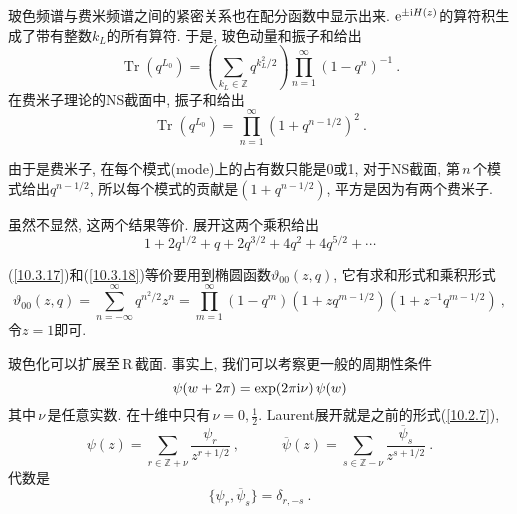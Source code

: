 玻色频谱与费米频谱之间的紧密关系也在配分函数中显示出来. $\mathrm{e}^{\pm\mathrm{i} H(z)}$的算符积生成了带有整数$k_{L}$的所有算符. 于是, 玻色动量和振子和给出
\begin{equation}
    \operatorname{Tr}(q^{L_{0}})=\left(\sum_{k_{L}\in\mathds{Z}}q^{k_{L}^{2}/2}\right)
    \prod_{n=1}^{\infty} (1-q^{n})^{-1}\:. \label{10.3.17}
\end{equation}
在费米子理论的NS截面中, 振子和给出
\begin{equation}
    \operatorname{Tr}(q^{L_{0}})=\prod_{n=1}^{\infty}(1+q^{n-1/2})^{2}\:. \label{10.3.18}
\end{equation}
\begin{tcolorbox}
由于是费米子, 在每个模式(mode)上的占有数只能是0或1, 对于NS截面, 第$\,n\,$个模式给出$q^{n-1/2}$, 所以每个模式的贡献是$(1+q^{n-1/2})$, 平方是因为有两个费米子.
\end{tcolorbox}
虽然不显然, 这两个结果等价. 展开这两个乘积给出
\begin{equation}
    1+2q^{1/2}+q+2q^{3/2}+4q^{2}+4q^{5/2} +\cdots \label{10.3.19}
\end{equation}
\begin{tcolorbox}
(\ref{10.3.17})和(\ref{10.3.18})等价要用到椭圆函数$\vartheta_{00}(z,q)$, 它有求和形式和乘积形式
\begin{equation*}
    \vartheta_{00}(z,q)=\sum_{n=-\infty}^{\infty}q^{n^{2}/2}z^{n} 
    =\prod_{m=1}^{\infty}(1-q^{m})(1+z q^{m-1/2})(1+z^{-1}q^{m-1/2})\:, 
\end{equation*}
令$z=1$即可.
\end{tcolorbox}

玻色化可以扩展至\,R\,截面. 事实上, 我们可以考察更一般的周期性条件
\begin{equation}
    \psi(w+2\pi) = \exp (2\pi\mathrm{i}\nu) \,\psi(w) \label{10.3.20}
\end{equation}
其中$\,\nu\,$是任意实数. 在十维中只有$\,\nu=0,\frac{1}{2}$. Laurent展开就是之前的形式(\ref{10.2.7}),
\begin{equation}
    \psi(z)=\sum_{r\in \mathds{Z}+\nu}\frac{\psi_{r}}{z^{r+1/2}} \:, \qquad\quad 
    \overline{\psi}(z)=\sum_{s\in\mathds{Z}-\nu}\frac{\overline{\psi}_{s}}{z^{s+1/2}}\:.
\end{equation}
代数是
\begin{equation}
    \{\psi_{r},\overline{\psi}_{s}\} =\delta_{r,-s} \:. \label{10.3.22}
\end{equation}

